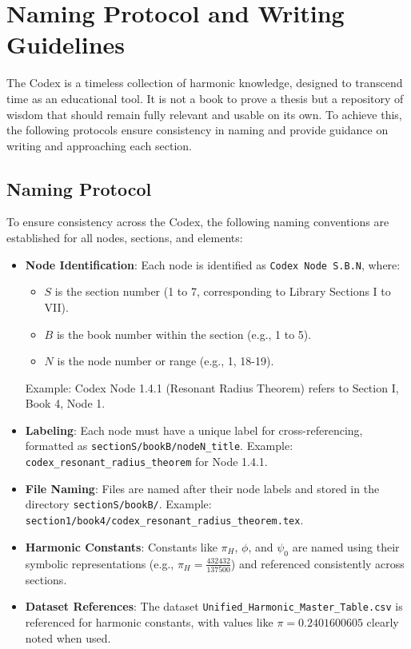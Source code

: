 
\section{Naming Protocol and Writing Guidelines}
\label{sec:naming_protocol}

The Codex is a timeless collection of harmonic knowledge, designed to transcend time as an educational tool. It is not a book to prove a thesis but a repository of wisdom that should remain fully relevant and usable on its own. To achieve this, the following protocols ensure consistency in naming and provide guidance on writing and approaching each section.

\subsection{Naming Protocol}
To ensure consistency across the Codex, the following naming conventions are established for all nodes, sections, and elements:

\begin{itemize}
    \item \textbf{Node Identification}: Each node is identified as \texttt{Codex Node S.B.N}, where:
    \begin{itemize}
        \item \( S \) is the section number (1 to 7, corresponding to Library Sections I to VII).
        \item \( B \) is the book number within the section (e.g., 1 to 5).
        \item \( N \) is the node number or range (e.g., 1, 18-19).
    \end{itemize}
    Example: Codex Node 1.4.1 (Resonant Radius Theorem) refers to Section I, Book 4, Node 1.

    \item \textbf{Labeling}: Each node must have a unique label for cross-referencing, formatted as \texttt{sectionS/bookB/nodeN\_title}. Example: \texttt{codex\_resonant\_radius\_theorem} for Node 1.4.1.

    \item \textbf{File Naming}: Files are named after their node labels and stored in the directory \texttt{sectionS/bookB/}. Example: \texttt{section1/book4/codex\_resonant\_radius\_theorem.tex}.

    \item \textbf{Harmonic Constants}: Constants like \(\pi_H\), \(\phi\), and \(\psi_0\) are named using their symbolic representations (e.g., \(\pi_H = \frac{432432}{137500}\)) and referenced consistently across sections.

    \item \textbf{Dataset References}: The dataset \texttt{Unified\_Harmonic\_Master\_Table.csv} is referenced for harmonic constants, with values like \(\pi = 0.2401600605\) clearly noted when used.
\end{itemize}

